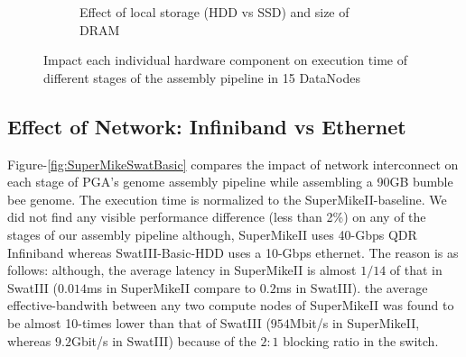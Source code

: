 \documentclass[conference]{IEEEtran}
\begin{document}
\begin{figure}[htb]
\begin{subfigure}[b]{0.23\textwidth}
                \caption{Effect of local storage (HDD vs SSD) and size of DRAM}
                \label{fig:SuperMikeSwatStorageMemory}
   \end{subfigure}
   \caption{Impact each individual hardware component on execution time of different stages of the assembly pipeline in 15 DataNodes }
  \label{fig:SuperMikeSwat}
\end{figure}


\subsection {Effect of Network: Infiniband vs Ethernet} \label{EffectOfNetwork}
Figure-\ref{fig:SuperMikeSwatBasic} compares the impact of network interconnect on each stage of PGA's genome assembly pipeline while assembling a 90GB bumble bee genome. 
The execution time is normalized to the SuperMikeII-baseline. %
We did not find any visible performance difference (less than 2\%) on any of the stages of our assembly pipeline although, SuperMikeII uses 40-Gbps QDR Infiniband whereas SwatIII-Basic-HDD uses a 10-Gbps ethernet. 
The reason is as follows: 
although, the average latency in SuperMikeII is almost $1/14$ of that in SwatIII ($0.014$ms in SuperMikeII compare to $0.2$ms in SwatIII). 
the average effective-bandwith between any two compute nodes of SuperMikeII was found to be almost 10-times lower than that of SwatIII ($954$Mbit/s in SuperMikeII, whereas $9.2$Gbit/s in SwatIII) because of the $2:1$ blocking ratio in the switch. 
 
\end{document}
